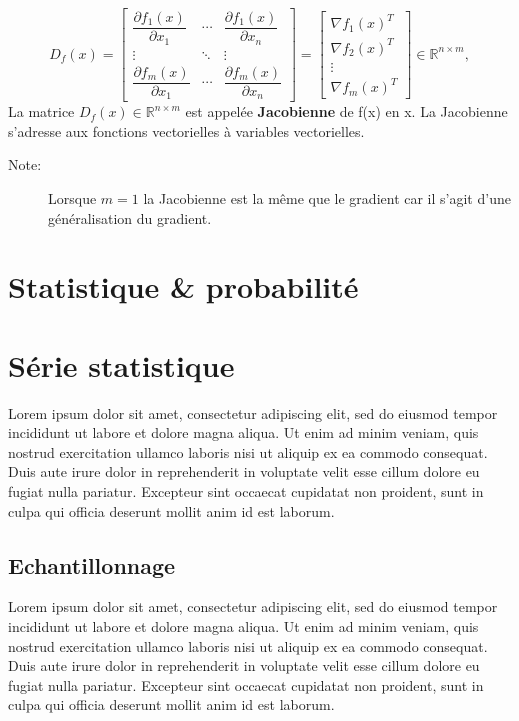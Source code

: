 	$$
	D_f\left(x\right)={
		\begin{bmatrix}
		{\dfrac {\partial f_{1}(x)}{\partial x_{1}}}&\cdots &{\dfrac {\partial f_{1}(x)}{\partial x_{n}}}\\
		\vdots &\ddots &\vdots \\
		{\dfrac {\partial f_{m}(x)}{\partial x_{1}}}&\cdots &{\dfrac {\partial f_{m}(x)}{\partial x_{n}}}
		\end{bmatrix}}
		=
		\begin{bmatrix}
		\nabla f_1(x)^T \\ \nabla f_2(x)^T\\ \vdots \\ \nabla f_m(x)^T
		\end{bmatrix}
		\in  \mathbb{R}^{n \times m},
	$$
	La matrice $D_f (x) \in  \mathbb{R}^{n \times m} $ est appelée \textbf{Jacobienne} de f(x) en x.
	La Jacobienne s’adresse aux fonctions vectorielles à variables vectorielles.
	
	
	
		
		
	\begin{description}
		\item[Note:] Lorsque $m=1$ la Jacobienne est la même que le gradient car il s'agit d'une généralisation du gradient.
	\end{description}
	
		
		
		
	\section{Statistique \& probabilité}
	\section{Série statistique}
		Lorem ipsum dolor sit amet, consectetur adipiscing elit, sed do eiusmod tempor incididunt ut labore et dolore magna aliqua. Ut enim ad minim veniam, quis nostrud exercitation ullamco laboris nisi ut aliquip ex ea commodo consequat. Duis aute irure dolor in reprehenderit in voluptate velit esse cillum dolore eu fugiat nulla pariatur. Excepteur sint occaecat cupidatat non proident, sunt in culpa qui officia deserunt mollit anim id est laborum.
	\subsection{Echantillonnage}
		Lorem ipsum dolor sit amet, consectetur adipiscing elit, sed do eiusmod tempor incididunt ut labore et dolore magna aliqua. Ut enim ad minim veniam, quis nostrud exercitation ullamco laboris nisi ut aliquip ex ea commodo consequat. Duis aute irure dolor in reprehenderit in voluptate velit esse cillum dolore eu fugiat nulla pariatur. Excepteur sint occaecat cupidatat non proident, sunt in culpa qui officia deserunt mollit anim id est laborum.
		
